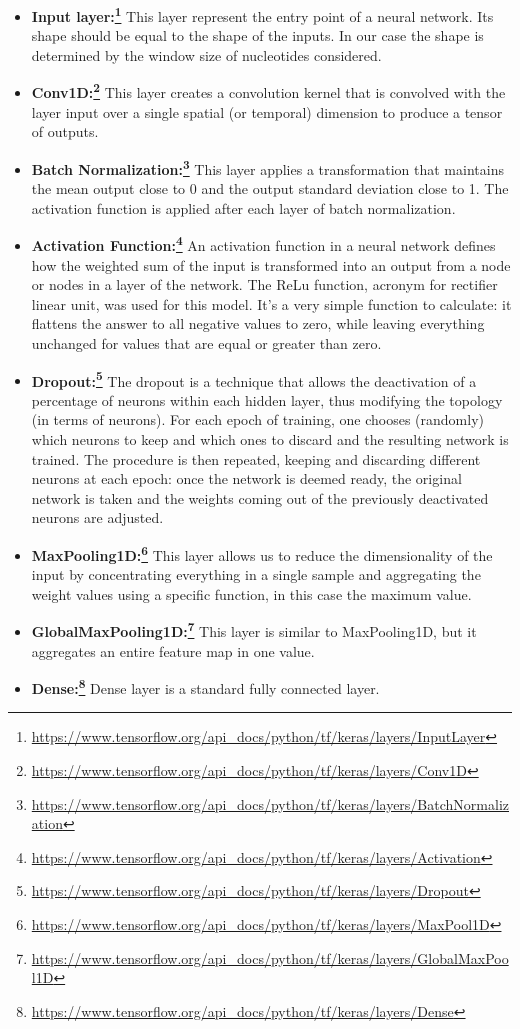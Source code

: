 \documentclass{article}
\begin{document}
\begin{itemize}
    \item \textbf{Input layer:\footnote{\url{https://www.tensorflow.org/api_docs/python/tf/keras/layers/InputLayer}}} This layer represent the entry point of a neural network. Its shape should be equal to the shape of the inputs. In our case the shape is determined by the window size of nucleotides considered.
    \item \textbf{Conv1D:\footnote{\url{https://www.tensorflow.org/api_docs/python/tf/keras/layers/Conv1D}}} This layer creates a convolution kernel that is convolved with the layer input over a single spatial (or temporal) dimension to produce a tensor of outputs.
    \item \textbf{Batch Normalization:\footnote{\url{https://www.tensorflow.org/api_docs/python/tf/keras/layers/BatchNormalization}}} This layer applies a transformation that maintains the mean output close to 0 and the output standard deviation close to 1. The activation function is applied after each layer of batch normalization.
    \item \textbf{Activation Function:\footnote{\url{https://www.tensorflow.org/api_docs/python/tf/keras/layers/Activation}}} An activation function in a neural network defines how the weighted sum of the input is transformed into an output from a node or nodes in a layer of the network. The ReLu function, acronym for rectifier linear unit, was used for this model. It's a very simple function to calculate: it flattens the answer to all negative values to zero, while leaving everything unchanged for values that are equal or greater than zero.
    \item \textbf{Dropout:\footnote{\url{https://www.tensorflow.org/api_docs/python/tf/keras/layers/Dropout}}} The dropout is a technique that allows the deactivation of a percentage of neurons within each hidden layer, thus modifying the topology (in terms of neurons). For each epoch of training, one chooses (randomly) which neurons to keep and which ones to discard and the resulting network is trained. The procedure is then repeated, keeping and discarding different neurons at each epoch: once the network is deemed ready, the original network is taken and the weights coming out of the previously deactivated neurons are adjusted.
    \item \textbf{MaxPooling1D:\footnote{\url{https://www.tensorflow.org/api_docs/python/tf/keras/layers/MaxPool1D}}} This layer allows us to reduce the dimensionality of the input by concentrating everything in a single sample and aggregating the weight values using a specific function, in this case the maximum value.
    \item \textbf{GlobalMaxPooling1D:\footnote{\url{https://www.tensorflow.org/api_docs/python/tf/keras/layers/GlobalMaxPool1D}}} This layer is similar to MaxPooling1D, but it aggregates an entire feature map in one value.
    \item \textbf{Dense:\footnote{\url{https://www.tensorflow.org/api_docs/python/tf/keras/layers/Dense}}} Dense layer is a standard fully connected layer.
\end{itemize}
\end{document}
